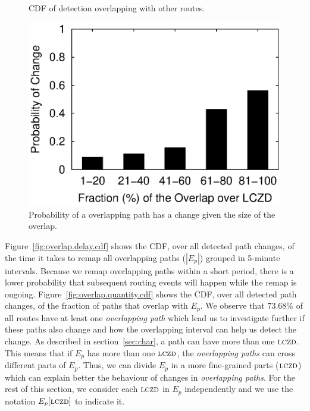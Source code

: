 \begin{figure}
\begin{minipage}{0.32\textwidth}
\caption{CDF of detection overlapping with other routes.}
\label{fig:overlap.quantity.cdf}
\end{minipage}
%
\hfill
\begin{minipage}{0.32\textwidth}
\includegraphics[width=1.05\columnwidth]{figs/patching/probchange/probchange.eps}
\caption{Probability of a overlapping path has a change given the size of the overlap.}
\label{fig:overlap.change.prob}
\end{minipage}
\end{figure}


Figure~\ref{fig:overlap.delay.cdf} shows the CDF, over all detected
path changes, of the time it takes to remap all
overlapping paths ($|E_p|$) grouped in 5-minute intervals.  
Because we remap overlapping paths within
a short period, there is a lower probability that subsequent routing
events will happen while the remap is ongoing.
Figure~\ref{fig:overlap.quantity.cdf} shows the CDF, over all
detected path changes, of the fraction of paths that overlap with $E_p$.  
We observe that 73.68\% of all routes have at least one 
\emph{overlapping path} which lead us to investigate further if these
paths also change and how the overlapping interval can help us detect the change.
As described in section~\ref{sec:char}, a path can have more than one
$\mathrm{\textsc{lczd}}$. This means that if $E_p$ has more than one $\mathrm{\textsc{lczd}}$, the \emph{overlapping
paths} can cross different parts of $E_p$. Thus, we can divide $E_p$ in a more
fine-grained parts ($\mathrm{\textsc{lczd}}$) which can explain better the behaviour of changes in
\emph{overlapping paths}. For the rest of this section, we
consider each $\mathrm{\textsc{lczd}}$ in $E_p$ independently and we use the notation $E_p[\mathrm{\textsc{lczd}}]$ 
to indicate it. 

